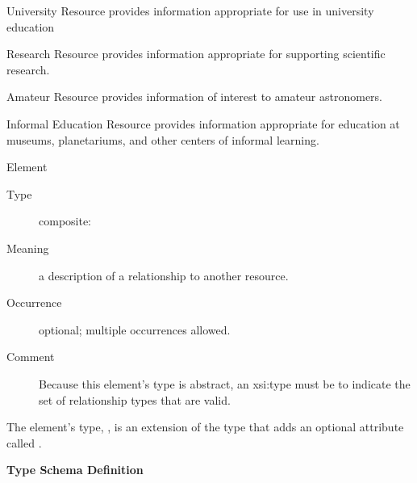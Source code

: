 \documentclass[11pt,a4paper]{ivoa}
\begin{document}
\begin{bigdescription}
\begin{description}
\begin{longtermsdescription}
\item[University]
               Resource provides information appropriate for use in
               university education
             
\item[Research]
               Resource provides information appropriate for
               supporting scientific research.
             
\item[Amateur]
               Resource provides information of interest to
               amateur astronomers.
             
\item[Informal Education]
               Resource provides information appropriate for education
               at museums, planetariums, and other centers of informal learning.
             
\end{longtermsdescription}

\end{description}
\item[Element \xmlel{relationship}]
\begin{description}
\item[Type] composite: 
\item[Meaning] 
               a description of a relationship to another resource.  
             
\item[Occurrence] optional; multiple occurrences allowed.
\item[Comment] 
                Because this element's type is abstract, an xsi:type must be 
                to indicate the set of relationship types that are valid.
             

\end{description}


\end{bigdescription}\endgroup

\endgroup



The  element's type,
, is an extension of the
 type that adds an optional attribute called
.  


\begingroup
      	\renewcommand*\descriptionlabel[1]{%
      	\hbox to 5.5em{\emph{#1}\hfil}}\vspace{1ex}\noindent\textbf{ Type Schema Definition}
\end{document}
